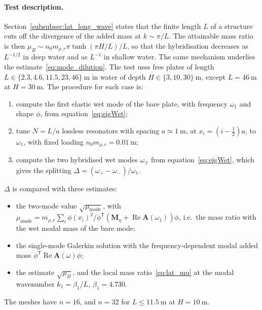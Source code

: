 {\paragraph{Test description.} Section~\ref{subsubsec:lat_long_wave} states that the finite length $L$ of a structure cuts off the divergence of the added mass at $k\sim\pi/L$. The attainable mass ratio is then $\mu_B\sim n_0m_{\rho,r}\pi\tanh(\pi H/L)/L$, so that the hybridisation decreases as $L^{-1/2}$ in deep water and as $L^{-1}$ in shallow water. The same mechanism underlies the estimate~\eqref{eq:mode_dilution}. The test uses free plates of length $L\in\{2.3,4.6,11.5,23,46\}~\si{\meter}$ in water of depth $H\in\{3,10,30\}~\si{\meter}$, except $L=46~\si{\meter}$ at $H=30~\si{\meter}$. The procedure for each case is:
\begin{enumerate}
    \item compute the first elastic wet mode of the bare plate, with frequency $\omega_1$ and shape $\phi$, from equation~\eqref{eq:eigWet};
    \item tune $N=L/a$ lossless resonators with spacing $a\simeq1~\si{\meter}$, at $x_i=(i-\tfrac12)a$, to $\omega_1$, with fixed loading $n_0m_{\rho,r}=0.01~\si{\meter}$;
    \item compute the two hybridised wet modes $\omega_\mp$ from equation~\eqref{eq:eigWet}, which gives the splitting $\Delta=(\omega_+-\omega_-)/\omega_1$.
\end{enumerate}
$\Delta$ is compared with three estimates:
\begin{itemize}
    \item the two-mode value $\sqrt{\mu_\mathrm{mode}}$, with $\mu_\mathrm{mode}=m_{\rho,r}\sum_i\phi(x_i)^2/\phi^{\mathsf T}(\mathbf{M}_\eta+\operatorname{Re}\mathbf{A}(\omega_1))\phi$, i.e.\ the mass ratio with the wet modal mass of the bare mode;
    \item the single-mode Galerkin solution with the frequency-dependent modal added mass $\phi^{\mathsf T}\operatorname{Re}\mathbf{A}(\omega)\phi$;
    \item the estimate $\sqrt{\mu_B}$, and the local mass ratio~\eqref{eq:lat_mu} at the modal wavenumber $k_1=\beta_1/L$, $\beta_1=4.730$.
\end{itemize}
The meshes have $n=16$, and $n=32$ for $L\le11.5~\si{\meter}$ at $H=10~\si{\meter}$.

}
